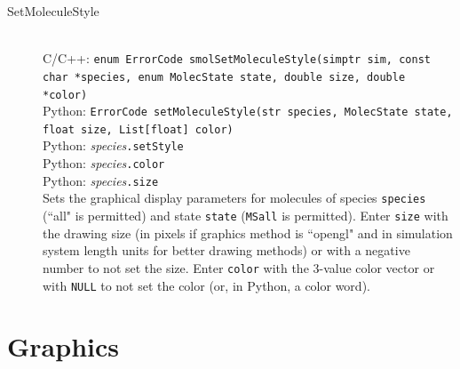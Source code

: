 \documentclass {scrbook}
\newcommand {\ttt} {\texttt}
\begin{document}
\begin{description}
\item[SetMoleculeStyle]
\hfill \\
C/C++: \ttt{enum ErrorCode smolSetMoleculeStyle(simptr sim, const char *species, enum MolecState state, double size, double *color)}\\
Python: \ttt{ErrorCode setMoleculeStyle(str species, MolecState state, float size, List[float] color)}\\
Python: \textit{species}\ttt{.setStyle}\\
Python: \textit{species}\ttt{.color}\\
Python: \textit{species}\ttt{.size}\\
Sets the graphical display parameters for molecules of species \ttt{species} (``all" is permitted) and state \ttt{state} (\ttt{MSall} is permitted). Enter \ttt{size} with the drawing size (in pixels if graphics method is ``opengl" and in simulation system length units for better drawing methods) or with a negative number to not set the size. Enter \ttt{color} with the 3-value color vector or with \ttt{NULL} to not set the color (or, in Python, a color word).

\end{description}


\section{Graphics}
\end{document}
